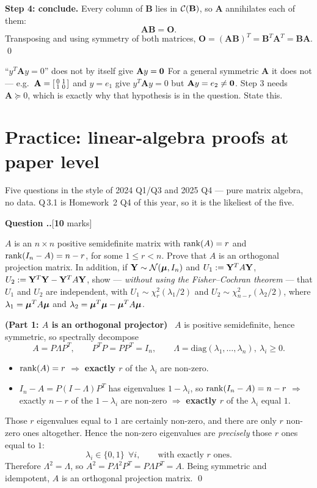 \documentclass[11pt]{article}
\newcounter{qq}[section]
\newcommand{\qhead}[2]{\medskip\refstepcounter{qq}%
  \noindent\textbf{\color{Blue}Question \thesection.\theqq.}\hfill\textnormal{[\textbf{#1} marks]}%
  \ifx\relax#2\relax\else\par\smallskip\fi}
\newcommand{\pt}[1]{\smallskip\noindent\textbf{(#1)}\ }
\begin{document}
\textbf{Step 4: conclude.} Every column of $\mathbf{B}$ lies in $\mathcal{C}(\mathbf{B})$, so
$\mathbf{A}$ annihilates each of them:
\[
  \mathbf{AB}=\mathbf{O}.
\]
Transposing and using symmetry of both matrices,
$\mathbf{O}=(\mathbf{AB})^T=\mathbf{B}^T\mathbf{A}^T=\mathbf{BA}$. \qed

\begin{confusion}{``$y^T\mathbf{A}y=0$'' does not by itself give $\mathbf{A}y=\mathbf{0}$}
For a general symmetric $\mathbf{A}$ it does not --- e.g.\
$\mathbf{A}=\begin{bsmallmatrix}0&1\\1&0\end{bsmallmatrix}$ and $y=e_1$ give
$y^T\mathbf{A}y=0$ but $\mathbf{A}y=e_2\ne\mathbf{0}$. Step 3 needs
$\mathbf{A}\succeq0$, which is exactly why that hypothesis is in the question. State this.
\end{confusion}

\section{Practice: linear-algebra proofs at paper level}

Five questions in the style of 2024 Q1/Q3 and 2025 Q4 --- pure matrix algebra, no data.
Q\,3.1 is Homework~2 Q4 of this year, so it is the likeliest of the five.

\qhead{10}{}
\begin{stmt}
$A$ is an $n\times n$ positive semidefinite matrix with $\operatorname{rank}(A)=r$ and
$\operatorname{rank}(I_n-A)=n-r$, for some $1\le r<n$. Prove that $A$ is an orthogonal projection matrix.
In addition, if $\mathbf{Y}\sim\mathcal{N}(\boldsymbol{\mu},I_n)$ and $U_1:=\mathbf{Y}^TA\mathbf{Y}$, $U_2:=\mathbf{Y}^T\mathbf{Y}-\mathbf{Y}^TA\mathbf{Y}$, show
--- \emph{without using the Fisher--Cochran theorem} --- that $U_1$ and $U_2$ are
independent, with $U_1\sim\chi^2_r(\lambda_1/2)$ and $U_2\sim\chi^2_{n-r}(\lambda_2/2)$,
where $\lambda_1=\boldsymbol{\mu}^TA\boldsymbol{\mu}$ and $\lambda_2=\boldsymbol{\mu}^T\boldsymbol{\mu}-\boldsymbol{\mu}^TA\boldsymbol{\mu}$.
\end{stmt}

\pt{Part 1: $A$ is an orthogonal projector} $A$ is positive semidefinite, hence symmetric, so
spectrally decompose
\[
  A=P\Lambda P^T,\qquad P^TP=PP^T=I_n,\qquad \Lambda=\mathrm{diag}(\lambda_1,\dots,\lambda_n),\ \lambda_i\ge0 .
\]
\begin{itemize}
  \item $\operatorname{rank}(A)=r$ $\Longrightarrow$ \textbf{exactly $r$} of the $\lambda_i$ are non-zero.
  \item $I_n-A=P(I-\Lambda)P^T$ has eigenvalues $1-\lambda_i$, so $\operatorname{rank}(I_n-A)=n-r$
        $\Longrightarrow$ exactly $n-r$ of the $1-\lambda_i$ are non-zero $\Longrightarrow$
        \textbf{exactly $r$} of the $\lambda_i$ equal $1$.
\end{itemize}
Those $r$ eigenvalues equal to $1$ are certainly non-zero, and there are only $r$ non-zero
ones altogether. Hence the non-zero eigenvalues are \emph{precisely} those $r$ ones equal to
$1$:
\[
  \lambda_i\in\{0,1\}\ \ \forall i,\qquad\text{with exactly } r \text{ ones.}
\]
Therefore $\Lambda^2=\Lambda$, so $A^2=P\Lambda^2P^T=P\Lambda P^T=A$. Being symmetric and
idempotent, $A$ is an orthogonal projection matrix. \qed
\end{document}

